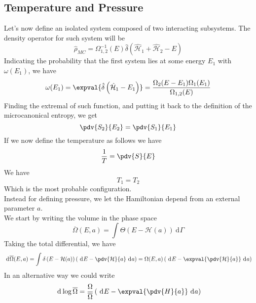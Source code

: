 \documentclass[a4paper, 11pt]{book}
\newcommand{\1}{\opr{\mathds{1}}}
\newcommand{\diff}[2][]{\ \mathrm{d}^{#1}#2}
\newcommand{\ham}{\mathcal{H}}
\newcommand{\opr}[1]{\hat{#1}}
\newcommand{\cc}[1]{\overline{#1}}
\theoremstyle{plain}
\begin{document}
		\subsection{Temperature and Pressure}
		Let's now define an isolated system composed of two interacting subsystems. The density operator for such system will be
		\begin{equation}
			\opr{\rho}_{MC}=\Omega_{1,2}^{-1}(E)\opr{\delta}\left( \opr{\ham}_1+\opr{\ham}_2-E \right)
			\label{eq:microcanonicalrho}
		\end{equation}
		Indicating the probability that the first system lies at some energy $E_1$ with $\omega(E_1)$, we have
		\begin{equation}
			\omega(E_1)=\expval{\opr{\delta}\left( \opr{\ham}_1-E_1 \right)}=\frac{\Omega_2(E-E_1)\Omega_1(E_1)}{\Omega_{1,2}(E)}
			\label{eq:omegaE1}
		\end{equation}
		Finding the extremal of such function, and putting it back to the definition of the microcanonical entropy, we get
		\begin{equation}
			\pdv{S_2}{E_2}=\pdv{S_1}{E_1}
			\label{eq:closedformentropy}
		\end{equation}
		If we now define the temperature as follows we have
		\begin{equation}
			\frac{1}{T}=\pdv{S}{E}
			\label{eq:temperaturedef}
		\end{equation}
		We have
		\begin{equation*}
			T_1=T_2
		\end{equation*}
		Which is the most probable configuration.\\
		Instead for defining pressure, we let the Hamiltonian depend from an external parameter $a$.\\
		We start by writing the volume in the phase space
		\begin{equation}
			\cc{\Omega}(E,a)=\int\Theta\left( E-\ham(a) \right)\diff{\Gamma}
			\label{eq:omegabarpressure}
		\end{equation}
		Taking the total differential, we have
		\begin{equation}
			\diff{\cc{\Omega}}(E,a)=\int_{}^{}\delta\left( E-\ham(a) \right)\left( \diff{E}-\pdv{\ham}{a}\diff{a} \right)=\Omega(E,a)\left( \diff{E}-\expval{\pdv{\ham}{a}}\diff{a} \right)
			\label{eq:diffccOmegaEpressure}
		\end{equation}
		In an alternative way we could write
		\begin{equation*}
			\diff{\log\cc{\Omega}}=\frac{\Omega}{\cc{\Omega}}\left( \diff{E}-\expval{\pdv{H}{a}}\diff{a} \right)
		\end{equation*}
\end{document}
